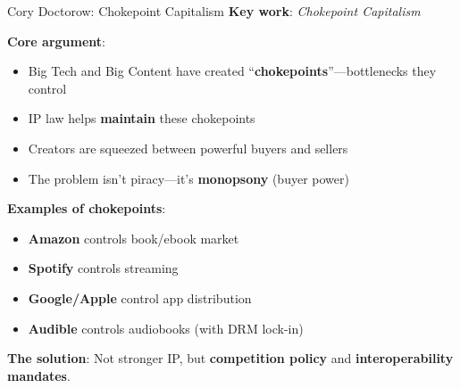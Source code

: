 ﻿\documentclass[aspectratio=169,11pt]{beamer}
\begin{document}
\begin{frame}{Cory Doctorow: Chokepoint Capitalism}
\textbf{Key work}: \textit{Chokepoint Capitalism} \parencite{doctorow_chokepoint}

\vspace{0.2cm}
\textbf{Core argument}:
\begin{itemize}
    \item Big Tech and Big Content have created ``\textbf{chokepoints}''---bottlenecks they control
    \item IP law helps \textbf{maintain} these chokepoints
    \item Creators are squeezed between powerful buyers and sellers
    \item The problem isn't piracy---it's \textbf{monopsony} (buyer power)
\end{itemize}

\vspace{0.3cm}
\textbf{Examples of chokepoints}:
\begin{itemize}
    \item \textbf{Amazon} controls book/ebook market
    \item \textbf{Spotify} controls streaming
    \item \textbf{Google/Apple} control app distribution
    \item \textbf{Audible} controls audiobooks (with DRM lock-in)
\end{itemize}

\vspace{0.2cm}
\textbf{The solution}: Not stronger IP, but \textbf{competition policy} and \textbf{interoperability mandates}.
\end{frame}
\end{document}
